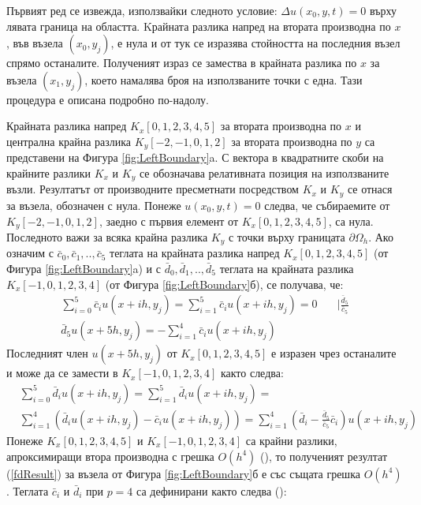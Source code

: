 \documentclass[a4paper]{article}
\newcommand{\rf}[1]{(\ref{#1})}
\theoremstyle{remark}
\begin{document}
\begin{large}
Първият ред се извежда, използвайки следното условие: $\Delta u(x_0, y, t) = 0$ върху лявата граница на областта. Kрайната разлика напред на втората производна по $x$, във възела $(x_0, y_j)$, е нула и от тук се изразява стойността на последния възел спрямо останалите. Полученият израз се замества в крайната разлика по $x$ за възела $(x_1, y_j)$, което намалява броя на използваните точки с една. Тази процедура е описана подробно по-надолу. 

Крайната разлика напред $K_x[0,1,2,3,4,5]$ за втората производна по $x$ и централна крайна разлика $K_y[-2,-1,0,1,2]$ за втората производна по $y$ са представени на Фигура \ref{fig:LeftBoundary}a. С вектора в квадратните скоби на крайните разлики $K_x$ и $K_y$ се обозначава релативната позиция на използваните възли. Резултатът от производните пресметнати посредством $K_x$ и $K_y$ се отнася за възела, обозначен с нула. Понеже $u(x_0, y, t) = 0$ следва, че събираемите от $K_y[-2,-1,0,1,2]$, заедно с първия елемент от $K_x[0,1,2,3,4,5]$, са нула. Последното важи за всяка крайна разлика $K_y$ с точки върху границата $\partial \Omega_h$. Ако означим с $\bar c_0, \bar c_1, .., \bar c_5$ теглата на крайната разлика напред $K_x[0,1,2,3,4,5]$ (от Фигура \ref{fig:LeftBoundary}a) и с $\bar d_0, \bar d_1,.., \bar d_5$ теглата на крайната разлика $K_x[-1,0,1,2,3,4]$ (от Фигура \ref{fig:LeftBoundary}б), се получава, че:
\begin{align}
\sum\limits_{i=0}^{5} \bar c_i u(x+ih, y_j) = \sum\limits_{i=1}^{5} \bar c_i u(x+ih, y_j) = 0 &  \quad | \frac{\bar d_5}{\bar c_5} \nonumber\\
\bar d_5 u(x+5h, y_j) = -\sum\limits_{i=1}^{4} \bar c_i u(x+ih, y_j) & \nonumber
\end{align}
Последният член $u(x+5h, y_j)$ от $K_x[0,1,2,3,4,5]$ е изразен чрез останалите и може да се замести в $K_x[-1,0,1,2,3,4]$ както следва:
\begin{align}\label{fdResult}
&\sum\limits_{i=0}^{5} \bar d_i u(x+ih, y_j) = \sum\limits_{i=1}^{5} \bar d_i u(x+ih, y_j)  =  \\
&\sum\limits_{i=1}^{4} \left( \bar d_i u(x+ih, y_j) - \bar c_i u(x+ih, y_j) \right) = \sum\limits_{i=1}^{4} \left( \bar d_i - \frac{\bar d_5}{\bar c_5} \bar c_i \right) u(x+ih, y_j) \nonumber
\end{align}
Понеже $K_x[0,1,2,3,4,5]$ и $K_x[-1,0,1,2,3,4]$ са крайни разлики, апроксимиращи втора производна с грешка $O(h^4)$ (\cite{forn}), то полученият резултат \rf{fdResult} за възела от Фигура \ref{fig:LeftBoundary}б е със същата грешка $O(h^4)$. Теглата $\bar c_i$ и $\bar d_i$ при $p=4$ са дефинирани както следва (\cite{forn}):

\end{large}
\end{document}
